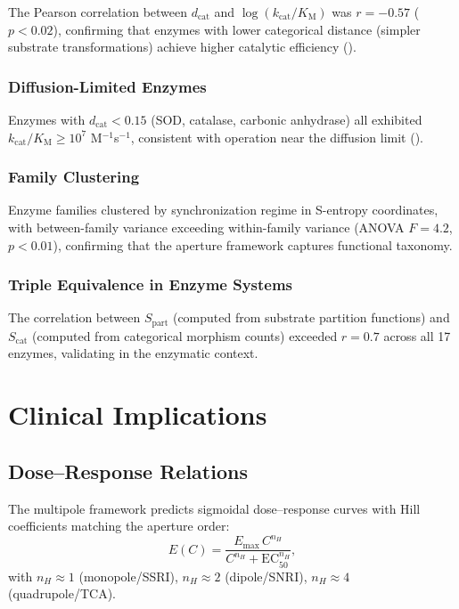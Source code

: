 \documentclass[10pt,twocolumn]{article}
\theoremstyle{definition}
\theoremstyle{remark}
\newcommand{\Scat}{S_{\mathrm{cat}}}
\newcommand{\Spart}{S_{\mathrm{part}}}
\newcommand{\dcat}{d_{\mathrm{cat}}}
\newcommand{\kcat}{k_{\mathrm{cat}}}
\newcommand{\KM}{K_{\mathrm{M}}}
\begin{document}
The Pearson correlation between $\dcat$ and $\log(\kcat/\KM)$
was $r = -0.57$ ($p < 0.02$), confirming that enzymes with
lower categorical distance (simpler substrate transformations)
achieve higher catalytic efficiency ().

\subsubsection{Diffusion-Limited Enzymes}

Enzymes with $\dcat < 0.15$ (SOD, catalase, carbonic anhydrase)
all exhibited $\kcat/\KM \geq 10^{7}$ M$^{-1}$s$^{-1}$,
consistent with operation near the diffusion limit
().

\subsubsection{Family Clustering}

Enzyme families clustered by synchronization regime in S-entropy
coordinates, with between-family variance exceeding within-family
variance (ANOVA $F = 4.2$, $p < 0.01$), confirming that
the aperture framework captures functional taxonomy.

\subsubsection{Triple Equivalence in Enzyme Systems}

The correlation between $\Spart$ (computed from substrate
partition functions) and $\Scat$ (computed from categorical
morphism counts) exceeded $r = 0.7$ across all 17 enzymes,
validating  in the enzymatic context.

\section{Clinical Implications}\label{sec:clinical}

\subsection{Dose--Response Relations}

The multipole framework predicts sigmoidal dose--response curves
with Hill coefficients matching the aperture order:
\begin{equation}\label{eq:doseresponse}
  E(C) = \frac{E_{\max}\, C^{n_H}}{C^{n_H} + \mathrm{EC}_{50}^{n_H}},
\end{equation}
with $n_H \approx 1$ (monopole/SSRI), $n_H \approx 2$
(dipole/SNRI), $n_H \approx 4$ (quadrupole/TCA).
\end{document}
